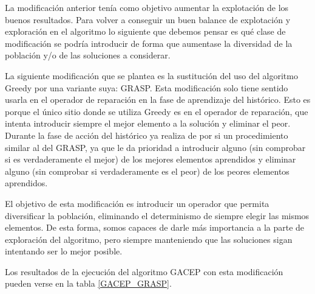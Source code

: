 La modificación anterior tenía como objetivo aumentar la explotación de los buenos resultados. 
Para volver a conseguir un buen balance de explotación y exploración en el algoritmo lo siguiente que debemos pensar es qué clase de modificación se podría introducir de forma que aumentase la diversidad de la población y/o de las soluciones a considerar. 

La siguiente modificación que se plantea es la sustitución del uso del algoritmo Greedy por una variante suya: GRASP. 
Esta modificación solo tiene sentido usarla en el operador de reparación en la fase de aprendizaje del histórico. 
Esto es porque el único sitio donde se utiliza Greedy es en el operador de reparación, que intenta introducir siempre el mejor elemento a la solución y eliminar el peor. 
Durante la fase de acción del histórico ya realiza de por si un procedimiento similar al del GRASP, ya que le da prioridad a introducir alguno (sin comprobar si es verdaderamente el mejor) de los mejores elementos aprendidos y eliminar alguno (sin comprobar si verdaderamente es el peor) de los peores elementos aprendidos. 

El objetivo de esta modificación es introducir un operador que permita diversificar la población, eliminando el determinismo de siempre elegir las mismos elementos. 
De esta forma, somos capaces de darle más importancia a la parte de exploración del algoritmo, pero siempre manteniendo que las soluciones sigan intentando ser lo mejor posible. 

Los resultados de la ejecución del algoritmo GACEP con esta modificación pueden verse en la tabla \ref{GACEP_GRASP}. 



